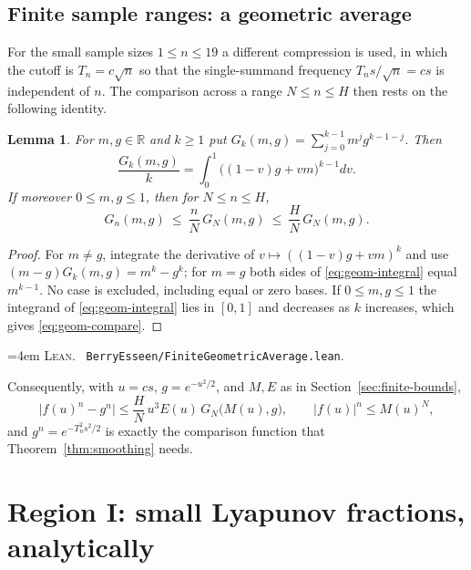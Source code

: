 \documentclass[10pt,a4paper]{article}
\theoremstyle{plain}
\newtheorem{lemma}[theorem]{Lemma}
\theoremstyle{definition}
\newcommand{\R}{\mathbb{R}}
\newcommand{\file}[1]{\texttt{#1}}
\newenvironment{leanref}%
  {\par\addvspace{3pt}\begingroup\sloppy\emergencystretch=4em
   \noindent\footnotesize\textsc{Lean.}\ \ignorespaces}%
  {\par\endgroup\addvspace{3pt}}
\begin{document}
\subsection{Finite sample ranges: a geometric average}
\label{sec:finite-geom}

For the small sample sizes $1\le n\le19$ a different compression is used, in
which the cutoff is $T_n=c\sqrt n$ so that the single-summand frequency
$T_ns/\sqrt n=cs$ is independent of $n$. The comparison across a range
$N\le n\le H$ then rests on the following identity.

\begin{lemma}\label{lem:geom-average}
For $m,g\in\R$ and $k\ge1$ put $G_k(m,g)=\sum_{j=0}^{k-1}m^jg^{k-1-j}$. Then
\begin{equation}\label{eq:geom-integral}
  \frac{G_k(m,g)}{k} = \int_0^1\bigl((1-v)g+vm\bigr)^{k-1}dv .
\end{equation}
If moreover $0\le m,g\le1$, then for $N\le n\le H$,
\begin{equation}\label{eq:geom-compare}
  G_n(m,g) \ \le\ \frac nN\,G_N(m,g) \ \le\ \frac HN\,G_N(m,g).
\end{equation}
\end{lemma}

\begin{proof}
For $m\ne g$, integrate the derivative of $v\mapsto((1-v)g+vm)^k$ and use
$(m-g)G_k(m,g)=m^k-g^k$; for $m=g$ both sides of
\eqref{eq:geom-integral} equal $m^{k-1}$. No case is excluded, including equal
or zero bases. If $0\le m,g\le1$ the integrand of
\eqref{eq:geom-integral} lies in $[0,1]$ and decreases as $k$ increases, which
gives \eqref{eq:geom-compare}.
\end{proof}

\begin{leanref}
\file{BerryEsseen/FiniteGeometricAverage.lean}.
\end{leanref}

Consequently, with $u=cs$, $g=e^{-u^2/2}$, and $M,E$ as in
Section~\ref{sec:finite-bounds},
\begin{equation}\label{eq:finite-power}
  \bigl|f(u)^n-g^n\bigr| \le \frac HN\,u^3E(u)\,G_N\bigl(M(u),g\bigr),
  \qquad |f(u)|^n \le M(u)^N ,
\end{equation}
and $g^n=e^{-T_n^2s^2/2}$ is exactly the comparison function that
Theorem~\ref{thm:smoothing} needs.

\section{Region I: small Lyapunov fractions, analytically}
\label{sec:small}
\end{document}
